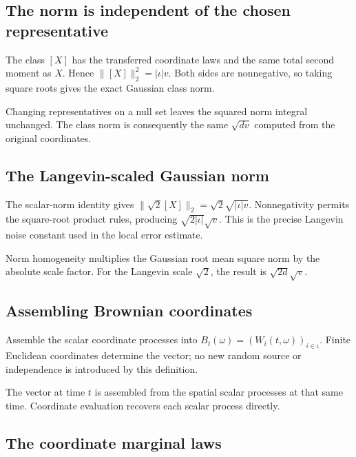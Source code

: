 \documentclass[11pt,a4paper]{article}
\begin{document}
\subsection{\texorpdfstring{The norm is independent of the chosen representative}{The norm is independent of the chosen representative}}


The class \([X]\) has the transferred coordinate laws and the same total second moment as \(X\). Hence \(\|[X]\|_2^2=|\iota|v\). Both sides are nonnegative, so taking square roots gives the exact Gaussian class norm.



Changing representatives on a null set leaves the squared norm integral unchanged. The class norm is consequently the same \(\sqrt{dv}\) computed from the original coordinates.


\subsection{\texorpdfstring{The Langevin-scaled Gaussian norm}{The Langevin-scaled Gaussian norm}}


The scalar-norm identity gives \(\|\sqrt2[X]\|_2=\sqrt2\sqrt{|\iota|v}\). Nonnegativity permits the square-root product rules, producing \(\sqrt{2|\iota|}\sqrt v\). This is the precise Langevin noise constant used in the local error estimate.



Norm homogeneity multiplies the Gaussian root mean square norm by the absolute scale factor. For the Langevin scale \(\sqrt2\), the result is \(\sqrt{2d}\sqrt v\).


\subsection{\texorpdfstring{Assembling Brownian coordinates}{Assembling Brownian coordinates}}


Assemble the scalar coordinate processes into \(B_t(\omega)=(W_i(t,\omega))_{i\in\iota}\). Finite Euclidean coordinates determine the vector; no new random source or independence is introduced by this definition.



The vector at time \(t\) is assembled from the spatial scalar processes at that same time. Coordinate evaluation recovers each scalar process directly.


\subsection{\texorpdfstring{The coordinate marginal laws}{The coordinate marginal laws}}
\end{document}

